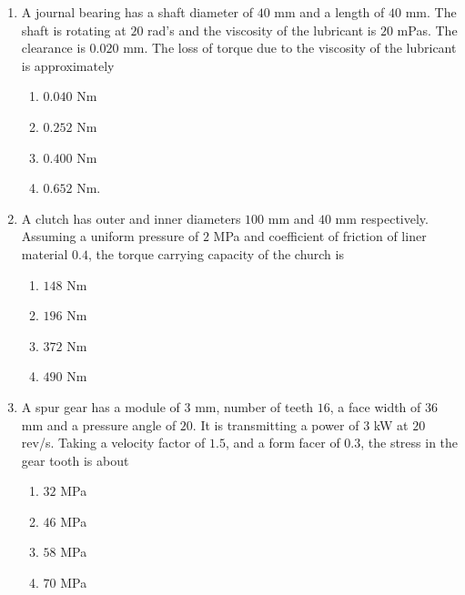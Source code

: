 \documentclass[journal]{IEEEtran}
\begin{document}
\begin{enumerate}[start=35]
    \item A journal bearing has a shaft diameter of $40$ mm and a length of $40$ mm. The shaft is rotating at $20$ rad's and the viscosity of the lubricant is $20$ mPas. The clearance is $0.020$ mm. The loss of torque due to the viscosity of the lubricant is approximately
    \begin{multicols}{4}
    \begin{enumerate}
        \item $0.040$ Nm
        \item $0.252$ Nm
        \item $0.400$ Nm
        \item $0.652$ Nm.
    \end{enumerate}
    \end{multicols}

    \item A clutch has outer and inner diameters $100$ mm and $40$ mm respectively. Assuming a uniform pressure of $2$ MPa and coefficient of friction of liner material $0.4$, the torque carrying capacity of the church is
    \begin{multicols}{4}
    \begin{enumerate}
        \item $148$ Nm
        \item $196$ Nm
        \item $372$ Nm
        \item $490$ Nm 
    \end{enumerate}
    \end{multicols}

    \item A spur gear has a module of $3$ mm, number of teeth $16$, a face width of $36$ mm and a pressure angle of $20$. It is transmitting a power of $3$ kW at $20$ rev/s. Taking a velocity factor of $1.5$, and a form facer of $0.3$, the stress in the gear tooth is about
    \begin{multicols}{4}
    \begin{enumerate}
        \item $32$ MPa
        \item $46$ MPa
        \item $58$ MPa
        \item $70$ MPa
    \end{enumerate}
    \end{multicols}


\end{enumerate}
\end{document}
